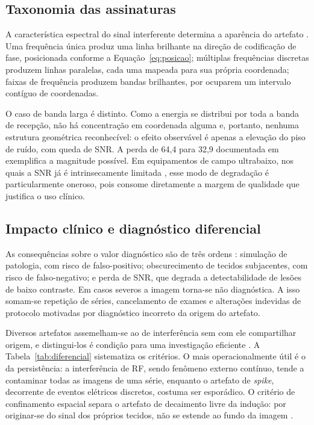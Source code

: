 \documentclass[portuguese]{sbcreviews-2025}%
\begin{document}
\subsection{Taxonomia das assinaturas}
\label{subsec:taxonomia}

A característica espectral do sinal interferente determina a aparência do artefato \citep{kwok2024rf}. Uma frequência única produz uma linha brilhante na direção de codificação de fase, posicionada conforme a Equação~\eqref{eq:posicao}; múltiplas frequências discretas produzem linhas paralelas, cada uma mapeada para sua própria coordenada; faixas de frequência produzem bandas brilhantes, por ocuparem um intervalo contíguo de coordenadas.

O caso de banda larga é distinto. Como a energia se distribui por toda a banda de recepção, não há concentração em coordenada alguma e, portanto, nenhuma estrutura geométrica reconhecível: o efeito observável é apenas a elevação do piso de ruído, com queda de SNR. A perda de 64,4 para 32,9 documentada em \citet{kwok2024rf} exemplifica a magnitude possível. Em equipamentos de campo ultrabaixo, nos quais a SNR já é intrinsecamente limitada \citep{marques2019lowfield}, esse modo de degradação é particularmente oneroso, pois consome diretamente a margem de qualidade que justifica o uso clínico.

\subsection{Impacto clínico e diagnóstico diferencial}
\label{subsec:diferencial}

As consequências sobre o valor diagnóstico são de três ordens \citep{kwok2024rf}: simulação de patologia, com risco de falso-positivo; obscurecimento de tecidos subjacentes, com risco de falso-negativo; e perda de SNR, que degrada a detectabilidade de lesões de baixo contraste. Em casos severos a imagem torna-se não diagnóstica. A isso somam-se repetição de séries, cancelamento de exames e alterações indevidas de protocolo motivadas por diagnóstico incorreto da origem do artefato.

Diversos artefatos assemelham-se ao de interferência sem com ele compartilhar origem, e distingui-los é condição para uma investigação eficiente \citep{kwok2024rf}. A Tabela~\ref{tab:diferencial} sistematiza os critérios. O mais operacionalmente útil é o da persistência: a interferência de RF, sendo fenômeno externo contínuo, tende a contaminar todas as imagens de uma série, enquanto o artefato de \textit{spike}, decorrente de eventos elétricos discretos, costuma ser esporádico. O critério de confinamento espacial separa o artefato de decaimento livre da indução: por originar-se do sinal dos próprios tecidos, não se estende ao fundo da imagem \citep{mugler2014optimized}.
\end{document}
